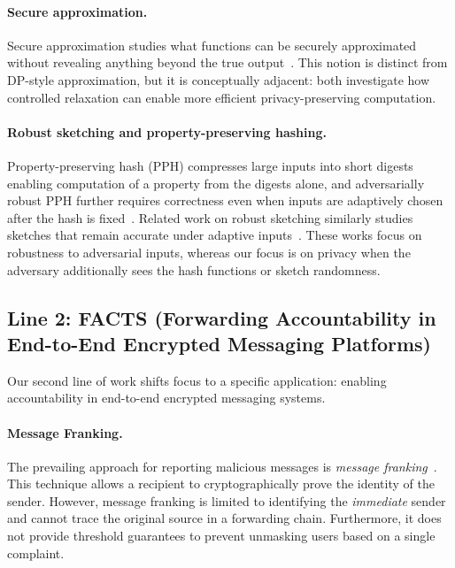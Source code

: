\paragraph{Secure approximation.}
Secure approximation studies what functions can be securely approximated without revealing anything beyond the true output~\cite{ICALP:FIMNSW01,STOC:HKKN01}. This notion is distinct from DP-style approximation, but it is conceptually adjacent: both investigate how controlled relaxation can enable more efficient privacy-preserving computation.

\paragraph{Robust sketching and property-preserving hashing.}
Property-preserving hash (PPH) compresses large inputs into short digests enabling computation of a property from the digests alone, and adversarially robust PPH further requires correctness even when inputs are adaptively chosen after the hash is fixed~\cite{itcs:BoyLavVai19,EC:FleSim21,EC:FleLarSim22,C:HLTW22}. Related work on robust sketching similarly studies sketches that remain accurate under adaptive inputs~\cite{ITCS:ACSS23,JACM:BJWY22}. These works focus on robustness to adversarial inputs, whereas our focus is on privacy when the adversary additionally sees the hash functions or sketch randomness.

\subsection{Line 2: FACTS (Forwarding Accountability in End-to-End Encrypted Messaging Platforms)}
Our second line of work shifts focus to a specific application: enabling accountability in end-to-end encrypted messaging systems.

\paragraph{Message Franking.}
The prevailing approach for reporting malicious messages is \emph{message franking}~\cite{C:DGRW18, C:TGLMR19, C:GruLuRis17}. This technique allows a recipient to cryptographically prove the identity of the sender. However, message franking is limited to identifying the \emph{immediate} sender and cannot trace the original source in a forwarding chain. Furthermore, it does not provide threshold guarantees to prevent unmasking users based on a single complaint.

